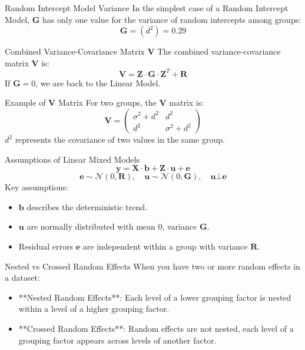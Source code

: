 \documentclass{beamer}
\begin{document}
\begin{frame}{Random Intercept Model Variance}
In the simplest case of a Random Intercept Model, $\mathbf{G}$ has only one value for the variance of random intercepts among groups:
\[
\mathbf{G} = \left( d^2 \right) = 0.29
\]
\end{frame}

\begin{frame}{Combined Variance-Covariance Matrix $\mathbf{V}$}
The combined variance-covariance matrix $\mathbf{V}$ is:
\[
\mathbf{V} = \mathbf{Z} \cdot \mathbf{G} \cdot \mathbf{Z}^T + \mathbf{R}
\]
If $\mathbf{G} = 0$, we are back to the Linear Model.
\end{frame}

\begin{frame}{Example of $\mathbf{V}$ Matrix}
For two groups, the $\mathbf{V}$ matrix is:
\[
\mathbf{V} = \left( 
\begin{array}{cc} 
\sigma^2 + d^2 & d^2 \\ 
d^2 & \sigma^2 + d^2 
\end{array} \right)
\]
$d^2$ represents the covariance of two values in the same group.
\end{frame}

\begin{frame}{Assumptions of Linear Mixed Models}
\[
\mathbf{y} = \mathbf{X} \cdot \mathbf{b} + \mathbf{Z} \cdot \mathbf{u} + \mathbf{e}
\]
\[
\mathbf{e} \sim \mathcal{N}(0, \mathbf{R}), \quad \mathbf{u} \sim \mathcal{N}(0, \mathbf{G}), \quad \mathbf{u} \bot \mathbf{e}
\]
Key assumptions:
\begin{itemize}
  \item $\mathbf{b}$ describes the deterministic trend.
  \item $\mathbf{u}$ are normally distributed with mean 0, variance $\mathbf{G}$.
  \item Residual errors $\mathbf{e}$ are independent within a group with variance $\mathbf{R}$.
\end{itemize}
\end{frame}

\begin{frame}{Nested vs Crossed Random Effects}
When you have two or more random effects in a dataset:
\begin{itemize}
  \item **Nested Random Effects**: Each level of a lower grouping factor is nested within a level of a higher grouping factor.
  \item **Crossed Random Effects**: Random effects are not nested, each level of a grouping factor appears across levels of another factor.
\end{itemize}
\end{frame}
\end{document}
